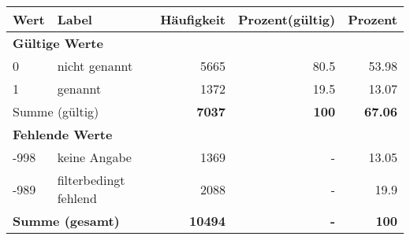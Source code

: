      \begin{longtable}{lXrrr}
     \toprule
     \textbf{Wert} & \textbf{Label} & \textbf{Häufigkeit} & \textbf{Prozent(gültig)} & \textbf{Prozent} \\
     \endhead
     \midrule
     \multicolumn{5}{l}{\textbf{Gültige Werte}}\\

     0 &
     \multicolumn{1}{X}{ nicht genannt   } &


       \num{5665} &
       \num[round-mode=places,round-precision=2]{80.5} &
         \num[round-mode=places,round-precision=2]{53.98} \\

     1 &
     \multicolumn{1}{X}{ genannt   } &


       \num{1372} &
       \num[round-mode=places,round-precision=2]{19.5} &
         \num[round-mode=places,round-precision=2]{13.07} \\
     \midrule
     \multicolumn{2}{l}{Summe (gültig)} &
       \textbf{\num{7037}} &
     \textbf{\num{100}} &
       \textbf{\num[round-mode=places,round-precision=2]{67.06}} \\
     \multicolumn{5}{l}{\textbf{Fehlende Werte}}\\
       -998 &
       keine Angabe &
         \num{1369} &
        - &
         \num[round-mode=places,round-precision=2]{13.05} \\
       -989 &
       filterbedingt fehlend &
         \num{2088} &
        - &
         \num[round-mode=places,round-precision=2]{19.9} \\
     \midrule
     \multicolumn{2}{l}{\textbf{Summe (gesamt)}} &
          \textbf{\num{10494}} &
        \textbf{-} &
        \textbf{\num{100}} \\
     \bottomrule
     \end{longtable}
     
